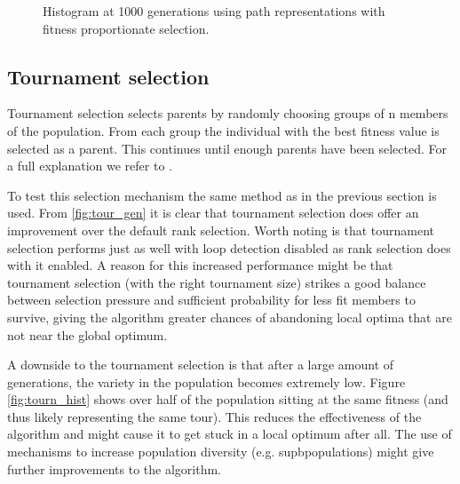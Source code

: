 \begin{figure}[!]
\centering
 
 \caption{Histogram at 1000 generations using path representations with fitness proportionate selection.}
 \label{fig:fps_hist}
\end{figure}


 \subsection{Tournament selection}
 Tournament selection selects parents by randomly choosing groups of n members of the population. From each group the individual with the best fitness value is selected as a parent. This continues until enough parents have been selected. For a full explanation we refer to \cite{handboek}.
 
 To test this selection mechanism the same method as in the previous section is used. From \ref{fig:tour_gen} it is clear that tournament selection does offer an improvement over the default rank selection. Worth noting is that tournament selection performs just as well with loop detection disabled as rank selection does with it enabled. A reason for this increased performance might be that tournament selection (with the right tournament size) strikes a good balance between selection pressure and sufficient probability for less fit members to survive, giving the algorithm greater chances of abandoning local optima that are not near the global optimum.
 
 A downside to the tournament selection is that after a large amount of generations, the variety in the population becomes extremely low. Figure \ref{fig:tourn_hist} shows over half of the population sitting at the same fitness (and thus likely representing the same tour). This reduces the effectiveness of the algorithm and might cause it to get stuck in a local optimum after all. The use of mechanisms to increase population diversity (e.g. supbpopulations) might give further improvements to the algorithm.
 
